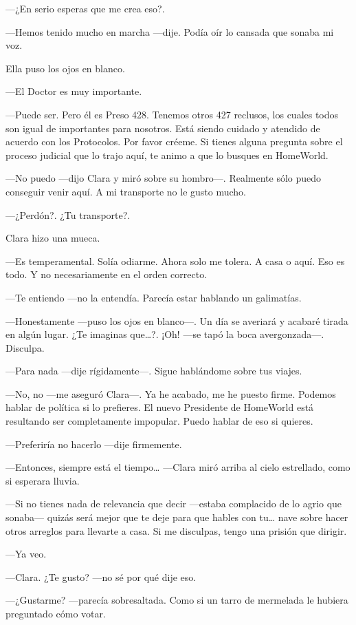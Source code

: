 ---¿En serio esperas que me crea eso?.

---Hemos tenido mucho en marcha ---dije. Podía oír lo cansada que sonaba
mi voz.

Ella puso los ojos en blanco.

---El Doctor es muy importante.

---Puede ser. Pero él es Preso 428. Tenemos otros 427 reclusos, los
cuales todos son igual de importantes para nosotros. Está siendo cuidado
y atendido de acuerdo con los Protocolos. Por favor créeme. Si tienes
alguna pregunta sobre el proceso judicial que lo trajo aquí, te animo a
que lo busques en HomeWorld.

---No puedo ---dijo Clara y miró sobre su hombro---. Realmente sólo
puedo conseguir venir aquí. A mi transporte no le gusto mucho.

---¿Perdón?. ¿Tu transporte?.

Clara hizo una mueca.

---Es temperamental. Solía odiarme. Ahora solo me tolera. A casa o aquí.
Eso es todo. Y no necesariamente en el orden correcto.

---Te entiendo ---no la entendía. Parecía estar hablando un galimatías.

---Honestamente ---puso los ojos en blanco---. Un día se averiará y
acabaré tirada en algún lugar. ¿Te imaginas que\ldots{}?. ¡Oh! ---se
tapó la boca avergonzada---. Disculpa.

---Para nada ---dije rígidamente---. Sigue hablándome sobre tus viajes.

---No, no ---me aseguró Clara---. Ya he acabado, me he puesto firme.
Podemos hablar de política si lo prefieres. El nuevo Presidente de
HomeWorld está resultando ser completamente impopular. Puedo hablar de
eso si quieres.

---Preferiría no hacerlo ---dije firmemente.

---Entonces, siempre está el tiempo\ldots{} ---Clara miró arriba al
cielo estrellado, como si esperara lluvia.

---Si no tienes nada de relevancia que decir ---estaba complacido de lo
agrio que sonaba--- quizás será mejor que te deje para que hables con
tu\ldots{} nave sobre hacer otros arreglos para llevarte a casa. Si me
disculpas, tengo una prisión que dirigir.

---Ya veo.

---Clara. ¿Te gusto? ---no sé por qué dije eso.

---¿Gustarme? ---parecía sobresaltada. Como si un tarro de mermelada le
hubiera preguntado cómo votar.

